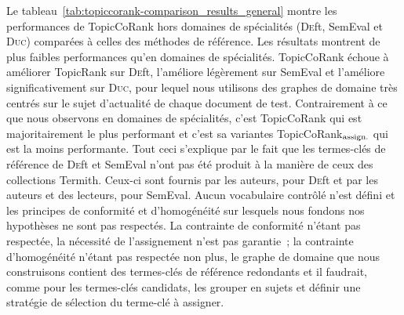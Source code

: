         Le tableau~\ref{tab:topiccorank-comparison_results_general} montre les
        performances de TopicCoRank hors domaines de spécialités (\textsc{De}ft,
        SemEval et \textsc{Duc}) comparées à celles des méthodes de référence.
        Les résultats montrent de plus faibles performances qu'en domaines de
        spécialités. TopicCoRank échoue à améliorer TopicRank sur \textsc{De}ft,
        l'améliore légèrement sur SemEval et l'améliore significativement sur
        \textsc{Duc}, pour lequel nous utilisons des graphes de domaine très
        centrés sur le sujet d'actualité de chaque document de test.
        Contrairement à ce que nous observons en domaines de spécialités, c'est
        TopicCoRank qui est majoritairement le plus performant et c'est sa
        variantes TopicCoRank$_\textnormal{assign.}$ qui est la moins
        performante. Tout ceci s'explique par le fait que les termes-clés de
        référence de \textsc{De}ft et SemEval n'ont pas été produit à la manière
        de ceux des collections Termith. Ceux-ci sont fournis par les auteurs,
        pour \textsc{De}ft et par les auteurs et des lecteurs, pour SemEval.
        Aucun vocabulaire contrôlé n'est défini et les principes de conformité
        et d'homogénéité sur lesquels nous fondons nos hypothèses ne sont pas
        respectés. La contrainte de conformité n'étant pas respectée, la
        nécessité de l'assignement n'est pas garantie~; la contrainte
        d'homogénéité n'étant pas respectée non plus, le graphe de domaine que
        nous construisons contient des termes-clés de référence redondants et il
        faudrait, comme pour les termes-clés candidats, les grouper en sujets et
        définir une stratégie de sélection du terme-clé à assigner.

